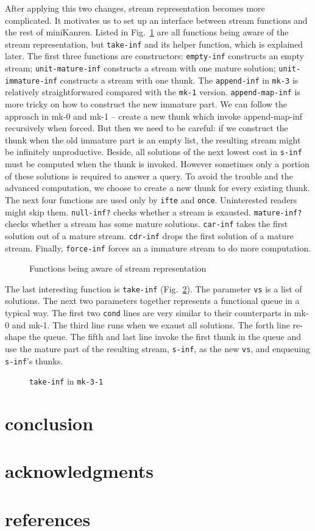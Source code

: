 \documentclass[format=acmlarge, review=true, authordraft=true]{acmart}
\begin{document}
After applying this two changes, stream representation becomes more complicated. It motivates us to set up an interface between stream functions and the rest of miniKanren. Listed in Fig.~\ref{interface} are all functions being aware of the stream representation, but \texttt{take-inf} and its helper function, which is explained later. The first three functions are constructors: \texttt{empty-inf} constructs an empty stream; \texttt{unit-mature-inf} constructs a stream with one mature solution; \texttt{unit-immature-inf} constructs a stream with one thunk. The \texttt{append-inf} in \texttt{mk-3} is relatively straightforwared compared with the \texttt{mk-1} version. \texttt{append-map-inf} is more tricky on how to construct the new immature part. We can follow the approach in mk-0 and mk-1 -- create a new thunk which invoke append-map-inf recursively when forced. But then we need to be careful: if we construct the thunk when the old immature part is an empty list, the resulting stream might be infinitely unproductive. Beside, all solutions of the next lowest cost in \texttt{s-inf} must be computed when the thunk is invoked. However sometimes only a portion of these solutions is required to answer a query. To avoid the trouble and the advanced computation, we choose to create a new thunk for every existing thunk. The next four functions are used only by \texttt{ifte} and \texttt{once}. Uninterested readers might skip them. \texttt{null-inf?} checks whether a stream is exausted. \texttt{mature-inf?} checks whether a stream has some mature solutions. \texttt{car-inf} takes the first solution out of a mature stream. \texttt{cdr-inf} drops the first solution of a mature stream. Finally, \texttt{force-inf} forces an a immature stream to do more computation.

\begin{figure}
	 	
	 \caption{Functions being aware of stream representation}
	 \label{interface}
\end{figure}


The last interesting function is \texttt{take-inf} (Fig.~\ref{take-inf-3-1}). The parameter \texttt{vs} is a list of solutions. The next two parameters together represents a functional queue in a typical way. The first two \texttt{cond} lines are very similar to their counterparts in mk-0 and mk-1. The third line runs when we exaust all solutions. The forth line re-shape the queue. The fifth and last line invoke the first thunk in the queue and use the mature part of the resulting stream, \texttt{s-inf}, as the new \texttt{vs}, and enqueuing \texttt{s-inf}'s thunks.

\begin{figure}
	 	
	 \caption{\texttt{take-inf} in \texttt{mk-3-1}}
	 \label{take-inf-3-1}
\end{figure}



\section{conclusion}

\section*{acknowledgments}

\section*{references}
\end{document}
